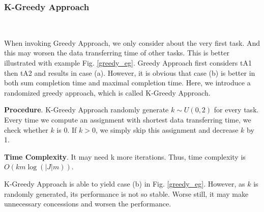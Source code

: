 \subsubsection{K-Greedy Approach}\label{k-Greedy Approach}
~



When invoking Greedy Approach, we only consider about the very first task. And this may worsen the data transferring time of other tasks. This is better illustrated with example Fig. \ref{greedy_eg}. Greedy Approach first considers tA1 then tA2 and results in case (a). However, it is obvious that case (b) is better in both sum completion time and maximal completion time. Here, we introduce a randomized greedy approach, which is called K-Greedy Approach.

\textbf{Procedure}.
K-Greedy Approach randomly generate $k\sim U(0,2)$ for every task. Every time we compute an assignment with shortest data transferring time, we check whether $k$ is 0. If $k>0$, we simply skip this assignment and decrease $k$ by 1.



\textbf{Time Complexity}.
It may need k more iterations. Thus, time complexity is $O(km\log (|J|m))$.

K-Greedy Approach is able to yield case (b) in Fig. \ref{greedy_eg}. However, as $k$ is randomly generated, its performance is not so stable. Worse still, it may make unnecessary concessions and worsen the performance. 

